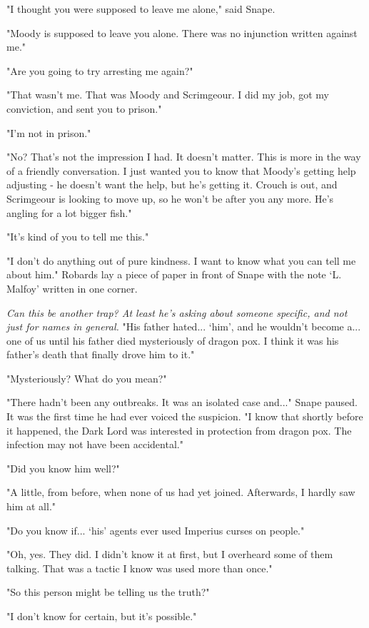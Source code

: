 \documentclass[a4paper,11pt]{article}
\begin{document}
"I thought you were supposed to leave me alone," said Snape.

"Moody is supposed to leave you alone. There was no injunction written against me."

"Are you going to try arresting me again?"

"That wasn't me. That was Moody and Scrimgeour. I did my job, got my conviction, and sent you to prison."

"I'm not in prison."

"No? That's not the impression I had. It doesn't matter. This is more in the way of a friendly conversation. I just wanted you to know that Moody's getting help adjusting - he doesn't want the help, but he's getting it. Crouch is out, and Scrimgeour is looking to move up, so he won't be after you any more. He's angling for a lot bigger fish."

"It's kind of you to tell me this."

"I don't do anything out of pure kindness. I want to know what you can tell me about him." Robards lay a piece of paper in front of Snape with the note `L. Malfoy' written in one corner.

\emph{Can this be another trap? At least he's asking about someone specific, and not just for names in general.} "His father hated... `him', and he wouldn't become a... one of us until his father died mysteriously of dragon pox. I think it was his father's death that finally drove him to it."

"Mysteriously? What do you mean?"

"There hadn't been any outbreaks. It was an isolated case and..." Snape paused. It was the first time he had ever voiced the suspicion. "I know that shortly before it happened, the Dark Lord was interested in protection from dragon pox. The infection may not have been accidental."

"Did you know him well?"

"A little, from before, when none of us had yet joined. Afterwards, I hardly saw him at all."

"Do you know if... `his' agents ever used Imperius curses on people."

"Oh, yes. They did. I didn't know it at first, but I overheard some of them talking. That was a tactic I know was used more than once."

"So this person might be telling us the truth?"

"I don't know for certain, but it's possible."
\end{document}
